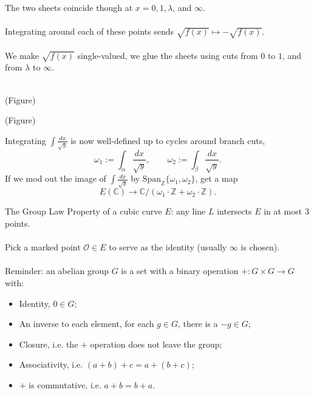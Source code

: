 \documentclass{beamer}
\begin{document}
\begin{frame}
	The two sheets coincide though at $x = 0, 1, \lambda$, and $\infty$. \\~\\
	
	Integrating around each of these points sends $\sqrt{f(x)} \longmapsto -\sqrt{f(x)}$. \\~\\
	
	We make $\sqrt{f(x)}$ single-valued, we glue the sheets using cuts from $0$ to $1$, and from $\lambda$ to $\infty$. \\~\\
	
	
	
	
\end{frame}

\begin{frame}	
	(Figure)
\end{frame}

\begin{frame}	
	(Figure)
\end{frame}

\begin{frame}
	Integrating $\int \frac{dx}{\sqrt{y}}$ is now well-defined up to cycles around branch cuts,
	$$
		\omega_{1} := \int_{\alpha} \frac{dx}{\sqrt{y}}, \qquad \omega_{2} := \int_{\beta} \frac{dx}{\sqrt{y}}.
	$$
	If we mod out the image of $\int \frac{dx}{\sqrt{y}}$ by $\text{Span}_{\mathbb{Z}}\{ \omega_{1}, \omega_{2} \}$, get a map
	$$
		E(\mathbb{C}) \longrightarrow \mathbb{C}/(\omega_{1}\cdot \mathbb{Z} + \omega_{2}\cdot \mathbb{Z} ).
	$$
\end{frame}

\begin{frame}[t]{The Group Law}
	Property of a cubic curve $E$: any line $L$ intersects $E$ in at most 3 points. \\~\\ 	
	
	Pick a marked point $\mathcal{O} \in E$ to serve as the identity (usually $\infty$ is chosen). \\~\\
	
	Reminder: an abelian group $G$ is a set with a binary operation $+ : G \times G \rightarrow G$ with:
	\begin{itemize}
		\item Identity, $0 \in G$;
		\item An inverse to each element, for each $g \in G$, there is a $-g \in G$;
		\item Closure, i.e. the $+$ operation does not leave the group;
		\item Associativity, i.e. $(a + b) + c = a + (b + c)$;
		\item $+$ is commutative, i.e. $a + b = b + a$.
	\end{itemize}
\end{frame}
\end{document}
